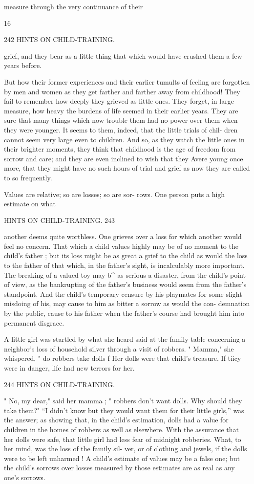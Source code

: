 \documentclass[
]{book}
\begin{document}
measure through the very continuance of their

16

242 HINTS ON CHILD-TRAINING.

grief, and they bear as a little thing that which would have crushed them a few years before.

But how their former experiences and their earlier tumults of feeling are forgotten by men and women as they get farther and farther away from childhood! They fail to remember how deeply they grieved as little ones. They forget, in large measure, how heavy the burdens of life seemed in their earlier years. They are sure that many things which now trouble them had no power over them when they were younger. It seems to them, indeed, that the little trials of chil- dren cannot seem very large even to children. And so, as they watch the little ones in their brighter moments, they think that childhood is the age of freedom from sorrow and care; and they are even inclined to wish that they Avere young once more, that they might have no such hours of trial and grief as now they are called to so frequently.

Values are relative; so are losses; so are sor- rows. One person puts a high estimate on what

HINTS ON CHILD-TRAINING. 243

another deems quite worthless. One grieves over a loss for which another would feel no concern. That which a child values highly may be of no moment to the child's father ; but its loss might be as great a grief to the child as would the loss to the father of that which, in the father's sight, is incalculably more important. The breaking of a valued toy may b\^{} as serious a disaster, from the child's point of view, as the bankrupting of the father's business would seem from the father's standpoint. And the child's temporary censure by his playmates for some slight misdoing of his, may cause to him as bitter a sorrow as would the con- demnation by the public, cause to his father when the father's course had brought him into permanent disgrace.

A little girl was startled by what she heard said at the family table concerning a neighbor's loss of household silver through a visit of robbers. " Mamma," she whispered, " do robbers take dolls f Her dolls were that child's treasure. If tiicy were in danger, life had new terrors for her.

244 HINTS ON CHILD-TRAINING.

" No, my dear," said her mamma ; " robbers don't want dolls. Why should they take them?" ``I didn't know but they would want them for their little girls,'' was the answer; as showing that, in the child's estimation, dolls had a value for children in the homes of robbers as well as elsewhere. With the assurance that her dolls were safe, that little girl had less fear of midnight robberies. What, to her mind, was the loss of the family sil- ver, or of clothing and jewels, if the dolls were to be left unharmed ! A child's estimate of values may be a false one; but the child's sorrows over losses measured by those estimates are as real as any one's sorrows.
\end{document}

